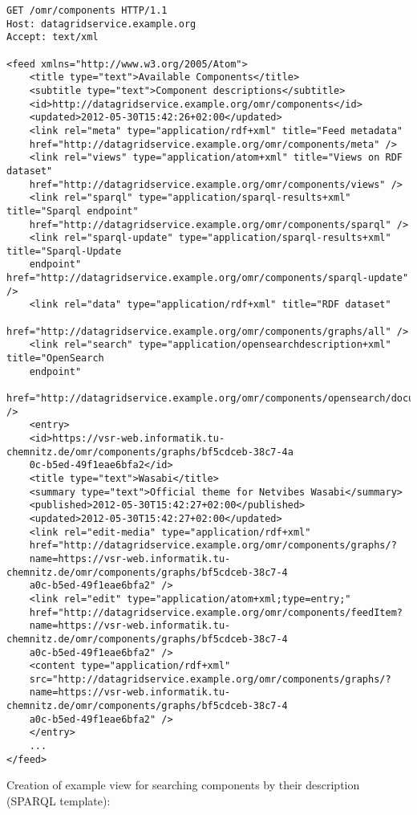 \begin{lstlisting}[style=consola]
GET /omr/components HTTP/1.1
Host: datagridservice.example.org
Accept: text/xml

<feed xmlns="http://www.w3.org/2005/Atom">
	<title type="text">Available Components</title>
	<subtitle type="text">Component descriptions</subtitle>
	<id>http://datagridservice.example.org/omr/components</id>
	<updated>2012-05-30T15:42:26+02:00</updated>
	<link rel="meta" type="application/rdf+xml" title="Feed metadata"
	href="http://datagridservice.example.org/omr/components/meta" />
	<link rel="views" type="application/atom+xml" title="Views on RDF dataset"
	href="http://datagridservice.example.org/omr/components/views" />
	<link rel="sparql" type="application/sparql-results+xml" title="Sparql endpoint"
	href="http://datagridservice.example.org/omr/components/sparql" />
	<link rel="sparql-update" type="application/sparql-results+xml" title="Sparql-Update
	endpoint" href="http://datagridservice.example.org/omr/components/sparql-update" />
	<link rel="data" type="application/rdf+xml" title="RDF dataset"
	href="http://datagridservice.example.org/omr/components/graphs/all" />
	<link rel="search" type="application/opensearchdescription+xml" title="OpenSearch
	endpoint"
	href="http://datagridservice.example.org/omr/components/opensearch/document" />
	<entry>
	<id>https://vsr-web.informatik.tu-chemnitz.de/omr/components/graphs/bf5cdceb-38c7-4a
	0c-b5ed-49f1eae6bfa2</id>
	<title type="text">Wasabi</title>
	<summary type="text">Official theme for Netvibes Wasabi</summary>
	<published>2012-05-30T15:42:27+02:00</published>
	<updated>2012-05-30T15:42:27+02:00</updated>
	<link rel="edit-media" type="application/rdf+xml"
	href="http://datagridservice.example.org/omr/components/graphs/?
	name=https://vsr-web.informatik.tu-chemnitz.de/omr/components/graphs/bf5cdceb-38c7-4
	a0c-b5ed-49f1eae6bfa2" />
	<link rel="edit" type="application/atom+xml;type=entry;"
	href="http://datagridservice.example.org/omr/components/feedItem?
	name=https://vsr-web.informatik.tu-chemnitz.de/omr/components/graphs/bf5cdceb-38c7-4
	a0c-b5ed-49f1eae6bfa2" />
	<content type="application/rdf+xml"
	src="http://datagridservice.example.org/omr/components/graphs/?
	name=https://vsr-web.informatik.tu-chemnitz.de/omr/components/graphs/bf5cdceb-38c7-4
	a0c-b5ed-49f1eae6bfa2" />
	</entry>
	...
</feed>

\end{lstlisting}

Creation of example view for searching components by their description (SPARQL template):

